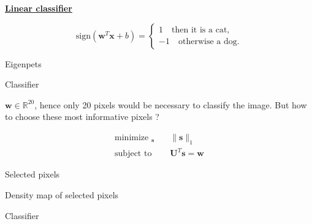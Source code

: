 \documentclass[aspectratio=169, usenames, dvipsnames]{beamer}
\DeclareMathOperator*{\minimize}{minimize~}
\DeclareMathOperator*{\subto}{subject~to~}
\begin{document}
\begin{frame}
  \vfill

  \begin{minipage}{.58\textwidth}
    \centering
    \underline{\textbf{Linear classifier}}

    \[
    \textrm{sign} \left( \bm{w}^T \bm{x} + b \right)
    =
    \begin{cases}
      1 \quad \textrm{then it is a cat,} \\
      -1 \quad \textrm{otherwise a dog.}
    \end{cases}
    \]
  \end{minipage}%
  \hfill
  \begin{minipage}{.48\textwidth}
  \end{minipage}

  \vfill
\end{frame}

\begin{frame}
  Eigenpets
\end{frame}

{

\begin{frame}
  Classifier
\end{frame}
}

\begin{frame}
  \vfill
  \begin{minipage}{.48\textwidth}
    $\bm{w} \in \mathbb{R}^{20}$, hence only 20 pixels would be necessary to classify the image.
    But how to choose these most informative pixels ?
  \end{minipage}%
  \hfill
  \begin{minipage}{.48\textwidth}
    \Large
    \[
    \begin{aligned}
      \minimize_{\bm{s}} & \quad \| \bm{s} \|_1 \\
      \subto & \quad \bm{U}^T \bm{s} = \bm{w}
    \end{aligned}
    \]
  \end{minipage}
  \vfill
\end{frame}

{

\begin{frame}
  Selected pixels
\end{frame}

\begin{frame}
  Density map of selected pixels
\end{frame}

\begin{frame}
  Classifier
\end{frame}

}
\end{document}
